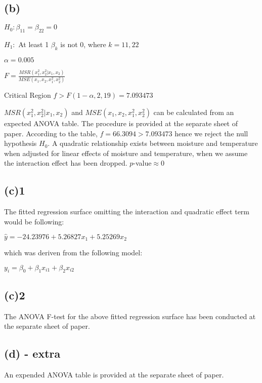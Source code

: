 \documentclass[letterpaper]{article}
\begin{document}
\subsection{(b)}
\begin{center}
$H_0: \beta_{11}=\beta_{22}=0$

$H_1: $ At least 1 $\beta_k$ is not 0, where $k = 11, 22$

$\alpha = 0.005$

$F = \frac{MSR(x^2_1,x^2_2|x_1,x_2)}{MSE(x_1, x_2, x^2_1, x^2_2)}$

Critical Region $f > F(1 - \alpha, 2, 19) = 7.093473$
\end{center}

\begin{flushleft}
$MSR(x^2_1,x^2_2|x_1,x_2)$ and $MSE(x_1, x_2, x^2_1, x^2_2)$ can be calculated from an expected ANOVA table. The procedure is provided at the separate sheet of paper. According to the table, $f = 66.3094 > 7.093473$ hence we reject the null hypothesis $H_0$. A quadratic relationship exists between moisture and temperature when adjusted for linear effects of moisture and temperature, when we assume the interaction effect has been dropped. $p$-value$\approx0$
\end{flushleft}

\subsection{(c)1}
\begin{flushleft}
The fitted regression surface omitting the interaction and quadratic effect term would be following:
\end{flushleft}

\begin{center}
$\hat{y} = - 24.23976 + 5.26827x_1 + 5.25269x_2$
\end{center}

\begin{flushleft}
which was deriven from the following model:
\end{flushleft}

\begin{center}
$y_i = \beta_0 + \beta_1x_{i1} + \beta_2x_{i2}$
\end{center}

\subsection{(c)2}
\begin{flushleft}
The ANOVA F-test for the above fitted regression surface has been conducted at the separate sheet of paper.
\end{flushleft}

\subsection{(d) - extra}
\begin{flushleft}
An expended ANOVA table is provided at the separate sheet of paper.
\end{flushleft}
\end{document}
